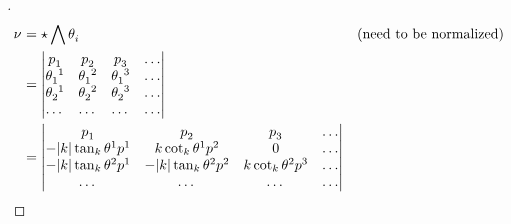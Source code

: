 \documentclass[stu, babel, american, biblatex, a4paper, leqno, draftall]{apa7}
\begin{document}
\begin{proof}[]
    \skipped


    \begin{align*}
        \tensor{\nu}{}
                    & = \star\bigwedge{\tensor{\theta}{_i}}                                                                        & \text{(need to be normalized)} \\
                    & = \left\vert
        \begin{matrix}
            \tensor{p}{_1}        & \tensor{p}{_2}        & \tensor{p}{_3}        & \dots \\
            \tensor{\theta}{_1^1} & \tensor{\theta}{_1^2} & \tensor{\theta}{_1^3} & \dots \\
            \tensor{\theta}{_2^1} & \tensor{\theta}{_2^2} & \tensor{\theta}{_2^3} & \dots \\
            \dots                 & \dots                 & \dots                 & \dots \\
        \end{matrix}
        \right\vert                                                                                                                                                 \\
                    & = \left\vert
        \begin{matrix}
            \tensor{p}{_1}                                    & \tensor{p}{_2}                                    & \tensor{p}{_3}                             & \dots \\
            -\abs{k}\tan_k{\tensor{\theta}{^1}}\tensor{p}{^1} & k\cot_k{\tensor{\theta}{^1}}\tensor{p}{^2}        & 0                                          & \dots \\
            -\abs{k}\tan_k{\tensor{\theta}{^2}}\tensor{p}{^1} & -\abs{k}\tan_k{\tensor{\theta}{^2}}\tensor{p}{^2} & k\cot_k{\tensor{\theta}{^2}}\tensor{p}{^3} & \dots \\
            \dots                                             & \dots                                             & \dots                                      & \dots \\
        \end{matrix}
        \right\vert                                                                                                                                                 \\

\end{align*}
\end{proof}
\end{document}
